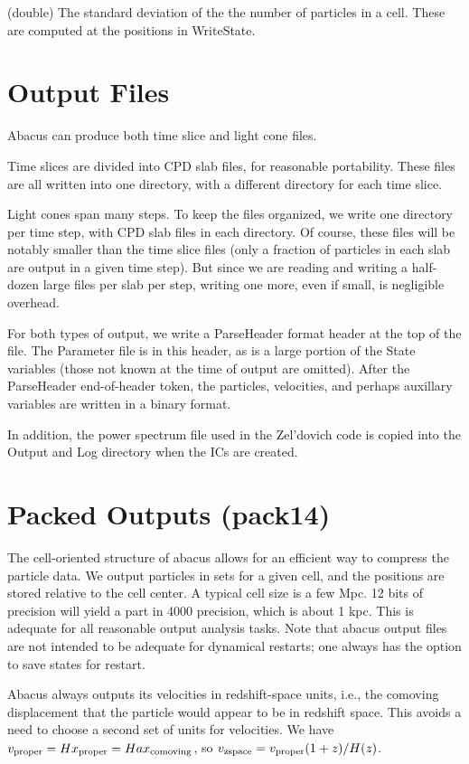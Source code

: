 \documentclass[11pt,preprint]{aastex}
\newcommand{\param}[2]{\medskip\noindent{\bf #1:} (#2) }
\begin{document}
\param{StdDevCellSize}{double} The standard deviation of the the
number of particles in a cell.  These are computed at the positions
in WriteState.


\clearpage
\section{Output Files}

Abacus can produce both time slice and light cone files.  

Time slices are divided into CPD slab files, for reasonable
portability.  These files are all written into one directory, with
a different directory for each time slice.

Light cones span many steps.  To keep the files organized, we write
one directory per time step, with CPD slab files in each directory.
Of course, these files will be notably smaller than the time slice
files (only a fraction of particles in each slab are output in a
given time step).  But since we are reading and writing a half-dozen
large files per slab per step, writing one more, even if small, is
negligible overhead.

For both types of output, we write a ParseHeader format header at
the top of the file.  The Parameter file is in this header, as is
a large portion of the State variables (those not known at the time
of output are omitted).  After the ParseHeader end-of-header token,
the particles, velocities, and perhaps auxillary variables are written
in a binary format.

In addition, the power spectrum file used in the Zel'dovich code
is copied into the Output and Log directory when the ICs are created.

\section{Packed Outputs (pack14)}

The cell-oriented structure of abacus allows for an efficient way
to compress the particle data.  We output particles in sets for a
given cell, and the positions are stored relative to the cell center.
A typical cell size is a few Mpc.  12 bits of precision will yield
a part in 4000 precision, which is about 1 kpc.  This is adequate
for all reasonable output analysis tasks.  Note that abacus output
files are not intended to be adequate for dynamical restarts; one
always has the option to save states for restart.

Abacus always outputs its velocities in redshift-space units, i.e.,
the comoving displacement that the particle would appear to be in
redshift space.  This avoids a need to choose a second set of units
for velocities.  We have $v_{\rm proper} = Hx_{\rm proper} =
Hax_{\rm comoving}$, so $v_{\rm zspace} = v_{\rm proper}(1+z)/H(z)$.
\end{document}

